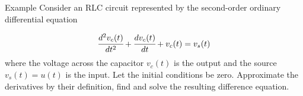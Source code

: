 \documentclass[aspectratio=169,xcolor=dvipsnames,svgnames,x11names,fleqn]{beamer}
\begin{document}
\begin{frame}{Example}
    Consider an RLC circuit represented by the second-order ordinary differential equation

    $$
    \cfrac{d^2 v_c (t)}{dt^2} + \cfrac{dv_c(t)}{dt} + v_c(t) = v_s(t)
    $$
    where the voltage across the capacitor $v_c(t)$ is the output and the source $v_s(t) = u(t)$ is the input. Let the initial conditions be zero. Approximate the derivatives by their definition, find and solve the resulting difference equation.

\end{frame}

\begin{frame}{}
\vspace*{-9\baselineskip}
    \color{LightGray}{Blank space for calculation}
\end{frame}
\begin{frame}{}
\vspace*{-9\baselineskip}
    \color{LightGray}{Blank space for calculation}
\end{frame}
\begin{frame}{}
\vspace*{-9\baselineskip}
    \color{LightGray}{Blank space for calculation}
\end{frame}
\begin{frame}{}
\vspace*{-9\baselineskip}
    \color{LightGray}{Blank space for calculation}
\end{frame}
\begin{frame}{}
\vspace*{-9\baselineskip}
    \color{LightGray}{Blank space for calculation}
\end{frame}
\begin{frame}{}
\vspace*{-9\baselineskip}
    \color{LightGray}{Blank space for calculation}
\end{frame}
\end{document}
